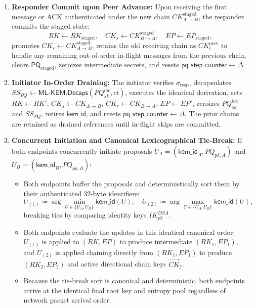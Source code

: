 \documentclass[11pt,a4paper]{article}
\theoremstyle{remark}
\theoremstyle{plain}
\newcommand{\MLKEM}{\mathsf{ML\text{-}KEM}}
\newcommand{\Decaps}{\mathsf{Decaps}}
\begin{document}
\begin{enumerate}
    The responder attaches $(kem\_id, ct, \sigma_{\mathrm{resp}})$ to its reply.
  \item \textbf{Responder Commit upon Peer Advance:} Upon receiving the first message or ACK authenticated under the new chain $CK_{A\to B}^{\mathrm{staged}}$, the responder commits the staged state:
    \[
      RK \leftarrow RK_{\mathrm{staged}}, \quad CK_s \leftarrow CK_{B\to A}^{\mathrm{staged}}, \quad EP \leftarrow EP_{\mathrm{staged}},
    \]
    promotes $CK_r \leftarrow CK_{A\to B}^{\mathrm{staged}}$, retains the old receiving chain as $CK_r^{\mathrm{prev}}$ to handle any remaining out-of-order in-flight messages from the previous chain, clears $\mathsf{PQ}_{\mathrm{staged}}$, zeroizes intermediate secrets, and resets $\mathsf{pq\_step\_counter} \leftarrow \Delta$.
  \item \textbf{Initiator In-Order Draining:} The initiator verifies $\sigma_{\mathrm{resp}}$, decapsulates $SS_{PQ} \gets \MLKEM.\Decaps(PQ^{loc}_{sk}, ct)$, executes the identical derivation, sets $RK \leftarrow RK'$, $CK_s \leftarrow CK_{A\to B}$, $CK_r \leftarrow CK_{B\to A}$, $EP \leftarrow EP'$, zeroizes $PQ^{loc}_{sk}$ and $SS_{PQ}$, retires $\mathsf{kem\_id}$, and resets $\mathsf{pq\_step\_counter} \leftarrow \Delta$. The prior chains are retained as drained references until in-flight skips are committed.
  \item \textbf{Concurrent Initiation and Canonical Lexicographical Tie-Break:} If both endpoints concurrently initiate proposals $U_A = (\mathsf{kem\_id}_A, PQ_{pk,A})$ and $U_B = (\mathsf{kem\_id}_B, PQ_{pk,B})$:
    \begin{itemize}
      \item Both endpoints buffer the proposals and deterministically sort them by their authenticated 32-byte identifiers:
        \[
          U_{(1)} \coloneqq \arg\min_{U \in \{U_A, U_B\}} \mathsf{kem\_id}(U), \quad
          U_{(2)} \coloneqq \arg\max_{U \in \{U_A, U_B\}} \mathsf{kem\_id}(U),
        \]
        breaking ties by comparing identity keys $IK^{DSA}_{pk}$.
      \item Both endpoints evaluate the updates in this identical canonical order: $U_{(1)}$ is applied to $(RK, EP)$ to produce intermediate $(RK_1, EP_1)$, and $U_{(2)}$ is applied chaining directly from $(RK_1, EP_1)$ to produce $(RK_2, EP_2)$ and active directional chain keys $\vec{CK}_2$.
      \item Because the tie-break sort is canonical and deterministic, both endpoints arrive at the identical final root key and entropy pool regardless of network packet arrival order.

\end{itemize}
\end{enumerate}
\end{document}
